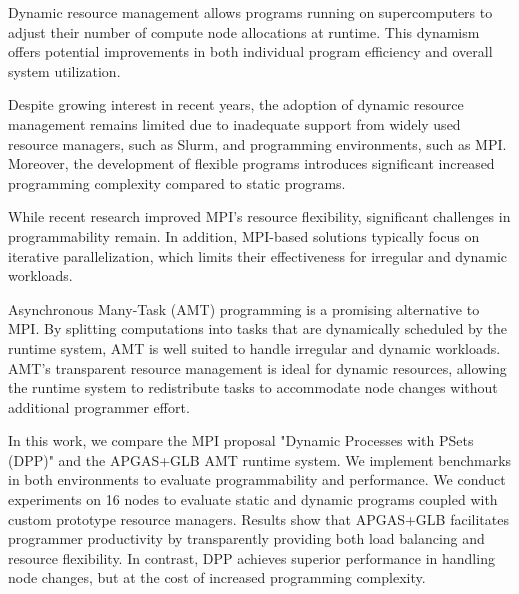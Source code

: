 Dynamic resource management allows programs running on supercomputers to adjust their number of compute node allocations at runtime. This dynamism offers potential improvements in both individual program efficiency and overall system utilization.

Despite growing interest in recent years, the adoption of dynamic resource management remains limited due to inadequate support from widely used resource managers, such as Slurm, and programming environments, such as MPI. Moreover, the development of flexible programs introduces significant increased programming complexity compared to static programs.

While recent research improved MPI's resource flexibility, significant challenges in programmability remain. In addition, MPI-based solutions typically focus on iterative parallelization, which limits their effectiveness for irregular and dynamic workloads.

Asynchronous Many-Task (AMT) programming is a promising alternative to MPI. By splitting computations into tasks that are dynamically scheduled by the runtime system, AMT is well suited to handle irregular and dynamic workloads. AMT's transparent resource management is ideal for dynamic resources, allowing the runtime system to redistribute tasks to accommodate node changes without additional programmer effort.

In this work, we compare the MPI proposal "Dynamic Processes with PSets (DPP)" and the APGAS+GLB AMT runtime system. We implement benchmarks in both environments to evaluate programmability and performance. We conduct experiments on 16 nodes to evaluate static and dynamic programs coupled with custom prototype resource managers. Results show that APGAS+GLB facilitates programmer productivity by transparently providing both load balancing and resource flexibility. In contrast, DPP achieves superior performance in handling node changes, but at the cost of increased programming complexity.
